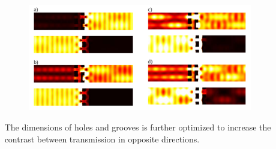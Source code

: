 \documentclass{beamer}
\begin{document}
\begin{frame}
\begin{columns}
\begin{column}{0.5\textwidth}
\begin{figure}
			\end{figure}
		\end{column}
		\begin{column}{0.5\textwidth}
			\begin{figure}
				\includegraphics[width=\textwidth]{../images/dmg/kontrast_energy.png}\\
			\end{figure}
			The dimensions of holes and grooves is further optimized to increase the contrast between transmission in opposite directions.
			
		\end{column}
	\end{columns}
		
\end{frame}
\end{document}
